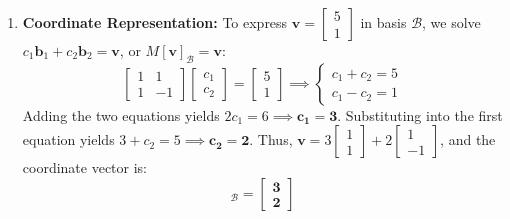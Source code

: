 \begin{enumerate}
    \item \textbf{Coordinate Representation:}
    To express $\mathbf{v} = \begin{bmatrix} 5 \\ 1 \end{bmatrix}$ in basis $\mathcal{B}$, we solve $c_1 \mathbf{b}_1 + c_2 \mathbf{b}_2 = \mathbf{v}$, or $M [\mathbf{v}]_\mathcal{B} = \mathbf{v}$:
    \begin{equation*}
    \begin{bmatrix} 1 & 1 \\ 1 & -1 \end{bmatrix} \begin{bmatrix} c_1 \\ c_2 \end{bmatrix} = \begin{bmatrix} 5 \\ 1 \end{bmatrix} \implies \begin{cases} c_1 + c_2 = 5 \\ c_1 - c_2 = 1 \end{cases}
    \end{equation*}
    Adding the two equations yields $2c_1 = 6 \implies \mathbf{c_1 = 3}$. Substituting into the first equation yields $3 + c_2 = 5 \implies \mathbf{c_2 = 2}$.
    Thus, $\mathbf{v} = 3 \begin{bmatrix} 1 \\ 1 \end{bmatrix} + 2 \begin{bmatrix} 1 \\ -1 \end{bmatrix}$, and the coordinate vector is:
    \begin{equation*}
    [\mathbf{v}]_\mathcal{B} = \mathbf{\begin{bmatrix} 3 \\ 2 \end{bmatrix}}
    \end{equation*}
\end{enumerate}


